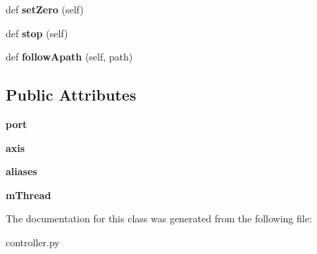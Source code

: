 \begin{DoxyCompactItemize}
\item 
\hypertarget{classpyagilis_1_1controller_1_1_a_g_u_c2_a33b44b25a249e4b84690f6d419015170}{}def {\bfseries set\+Zero} (self)\label{classpyagilis_1_1controller_1_1_a_g_u_c2_a33b44b25a249e4b84690f6d419015170}

\item 
\hypertarget{classpyagilis_1_1controller_1_1_a_g_u_c2_aa477fada704e720021125f4cd90a246d}{}def {\bfseries stop} (self)\label{classpyagilis_1_1controller_1_1_a_g_u_c2_aa477fada704e720021125f4cd90a246d}

\item 
\hypertarget{classpyagilis_1_1controller_1_1_a_g_u_c2_a4e33dbd5194d82d17375a7353bbd3eab}{}def {\bfseries follow\+Apath} (self, path)\label{classpyagilis_1_1controller_1_1_a_g_u_c2_a4e33dbd5194d82d17375a7353bbd3eab}

\end{DoxyCompactItemize}
\subsection*{Public Attributes}
\begin{DoxyCompactItemize}
\item 
\hypertarget{classpyagilis_1_1controller_1_1_a_g_u_c2_ad83a76829f65a17b43d2d50167a170d9}{}{\bfseries port}\label{classpyagilis_1_1controller_1_1_a_g_u_c2_ad83a76829f65a17b43d2d50167a170d9}

\item 
\hypertarget{classpyagilis_1_1controller_1_1_a_g_u_c2_ac56df0be4d47a97c893330a5a332a738}{}{\bfseries axis}\label{classpyagilis_1_1controller_1_1_a_g_u_c2_ac56df0be4d47a97c893330a5a332a738}

\item 
\hypertarget{classpyagilis_1_1controller_1_1_a_g_u_c2_aca4825e154ba7c1d0983fe450086377c}{}{\bfseries aliases}\label{classpyagilis_1_1controller_1_1_a_g_u_c2_aca4825e154ba7c1d0983fe450086377c}

\item 
\hypertarget{classpyagilis_1_1controller_1_1_a_g_u_c2_ac45fee51f82e78301a27eee0f1adc3dd}{}{\bfseries m\+Thread}\label{classpyagilis_1_1controller_1_1_a_g_u_c2_ac45fee51f82e78301a27eee0f1adc3dd}

\end{DoxyCompactItemize}


The documentation for this class was generated from the following file\+:\begin{DoxyCompactItemize}
\item 
controller.\+py\end{DoxyCompactItemize}
